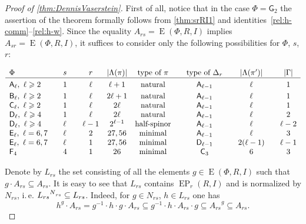 \documentclass[oneside, 12pt]{amsart}
\theoremstyle{plain}
\numberwithin{equation}{section}
\numberwithin{lemma}{section}
\theoremstyle{definition}
\theoremstyle{remark}
\DeclareMathOperator{\E}{E}
\DeclareMathOperator{\EP}{EP}
\newcommand{\rA}{\mathsf{A}}
\newcommand{\rB}{\mathsf{B}}
\newcommand{\rC}{\mathsf{C}}
\newcommand{\rD}{\mathsf{D}}
\newcommand{\rE}{\mathsf{E}}
\newcommand{\rF}{\mathsf{F}}
\newcommand{\rG}{\mathsf{G}}
\def\ssub#1{\mathchoice
   {_{\lower2pt\hbox{$\scriptstyle #1$}}}
   {_{\lower2pt\hbox{$\scriptstyle #1$}}}
   {_{\lower1.5pt\hbox{$\scriptscriptstyle #1$}}}
   {_{\!\lower1.5pt\hbox{$\scriptscriptstyle #1$}}}}
\begin{document}
\begin{proof}[Proof of \cref{thm:DennisVaserstein}]
First of all, notice that in the case $\Phi=\rG_2$ the assertion of the theorem formally follows from \cref{thm:srRI1} and identities~\ref{rel:h-comm}--\ref{rel:h-w}.
Since the equality $A_{rs} = \E(\Phi, R, I)$ implies $A_{sr} = \E(\Phi, R, I)$, it suffices to consider only the following possibilities for $\Phi$, $s$, $r$:
\begin{table}[htb]
\[\begin{array}{l @{\qquad} l @{\qquad} c @{\quad} c @{\quad} c @{\qquad} c @{\qquad} c @{\qquad} c}
\Phi                                 & s    &r      & |\Lambda(\pi)| & \text{type of $\pi$} & \text{type of $\Delta_r$} & |\Lambda(\pi')|& |\Gamma|  \\ \hline\vphantom{\Bigl(}
\rA_\ell, \ \ell\geqslant 2           & 1    &\ell   & \ell+1         & \text{natural}       & \rA_{\ell-1}              & \ell           & 1  \\     
\rB_\ell, \ \ell\geqslant 2           & 1    &\ell   & 2\ell+1        & \text{natural}       & \rA_{\ell-1}              & \ell           & 1  \\     
\rC_\ell, \ \ell\geqslant 2           & 1    &\ell   & 2\ell          & \text{natural}       & \rA_{\ell-1}              & \ell           & 1  \\
\rD_\ell, \ \ell\geqslant 4           & 1    &\ell   & 2\ell          & \text{natural}       & \rA_{\ell-1}              & \ell           & 2  \\ 
\rD_\ell, \ \ell\geqslant 4           & \ell &\ell-1 & 2^{\ell-1}     & \text{half-spinor}   & \rA_{\ell-1}              & \ell           & \ell-2  \\
\rE_\ell, \ \ell=6, 7                  & \ell &2      & 27, 56         & \text{minimal}       & \rA_{\ell-1}              & \ell           & 3       \\ 
\rE_\ell, \ \ell=6, 7                  & \ell &1      & 27, 56         & \text{minimal}       & \rD_{\ell-1}              & 2(\ell-1)      & \ell-1  \\
\rF_4                                & 4    &1     & 26             & \text{minimal}       & \rC_3                     & 6              & 3\end{array}\]
 \caption{List of the cases considered in the proof of \cref{thm:DennisVaserstein}.} \label{table:dv-reps}
\end{table}

Denote by $L_{rs}$ the set consisting of all the elements $g\in \E(\Phi, R, I)$ such that $g \cdot A_{rs} \subseteq A_{rs}$.
It is easy to see that $L_{rs}$ contains $\EP_r(R, I)$ and is normalized by $N_{rs}$, i.\,e. ${L_{rs}}^{N\ssub{rs}}\subseteq L_{rs}$. Indeed, for $g\in N_{rs}$, $h\in L_{rs}$ one has
\begin{equation}\label{rel:NnormL} h^g \cdot A_{rs} = g^{-1} \cdot h \cdot g \cdot A_{rs} \subseteq g^{-1} \cdot h \cdot A_{rs} \cdot g \subseteq {A_{rs}}^g \subseteq A_{rs}.\end{equation}


\end{proof}
\end{document}
